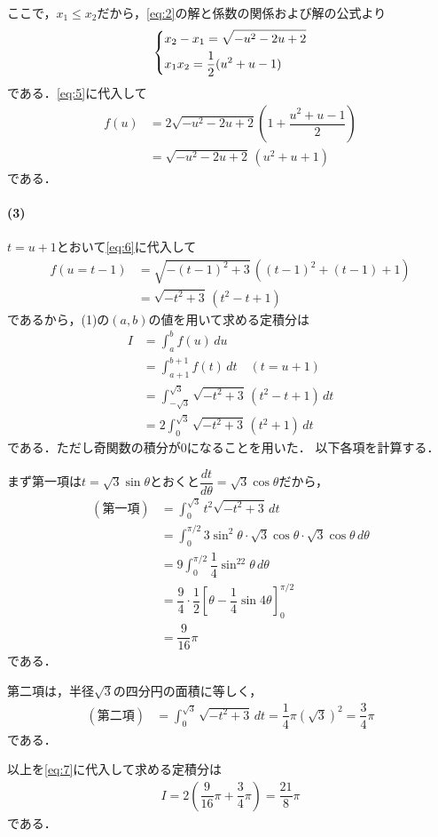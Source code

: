 \documentclass[../../main.tex]{subfiles}
\begin{document}
ここで，$x_1\le x_2$だから，\cref{eq:2}の解と係数の関係および解の公式より
\begin{align}
  \begin{dcases}
    x_2-x_1=\sqrt{-u^2-2u+2} \\
    x_1x_2=\dfrac{1}{2}(u^2+u-1)
  \end{dcases}
\end{align}
である．\cref{eq:5}に代入して
\begin{align}
  f(u)
  &=2\sqrt{-u^2-2u+2}\left(1+\dfrac{u^2+u-1}{2}\right)\\
  &=\sqrt{-u^2-2u+2}\,(u^2+u+1) \label{eq:6}
\end{align}
である．

\paragraph{(3)}

$t=u+1$とおいて\cref{eq:6}に代入して
\begin{align}
  f(u=t-1)
  &=\sqrt{-(t-1)^2+3}\,\left((t-1)^2+(t-1)+1\right)\\
  &=\sqrt{-t^2+3}\,(t^2-t+1)
\end{align}
であるから，(1)の$(a,b)$の値を用いて求める定積分は
\begin{align}
  I
  &=\int_{a}^{b}f(u)\, du \\
  &=\int_{a+1}^{b+1}f(t)\, dt  \quad (t=u+1) \\
  &=\int_{-\sqrt{3}}^{\sqrt{3}}\sqrt{-t^2+3}\,(t^2-t+1)\,dt \\
  &=2\int_0^{\sqrt{3}}\sqrt{-t^2+3}\,(t^2+1)\,dt \label{eq:7}
\end{align}
である．ただし奇関数の積分が$0$になることを用いた．
以下各項を計算する．

まず第一項は$t=\sqrt{3}\sin\theta$とおくと$\dfrac{dt}{d\theta}=\sqrt{3}\cos\theta$だから，
\begin{align}
  (\text{第一項})
  &= \int_0^{\sqrt{3}}t^2\sqrt{-t^2+3}\,dt \\
  &=\int_0^{\pi/2}3\sin^2\theta\cdot\sqrt{3}\cos\theta\cdot\sqrt{3}\cos\theta\,d\theta\\
  &=9\int_0^{\pi/2}\dfrac{1}{4}\sin^22\theta\,d\theta\\
  &=\dfrac{9}{4}\cdot\dfrac{1}{2}\left[\theta-\dfrac{1}{4}\sin4\theta\right]_0^{\pi/2} \\
  &=\dfrac{9}{16}\pi
\end{align}
である．

第二項は，半径$\sqrt{3}$の四分円の面積に等しく，
\begin{align}
  (\text{第二項})
  &=\int_0^{\sqrt{3}}\sqrt{-t^2+3}\,dt=\dfrac{1}{4}\pi(\sqrt{3})^2=\dfrac{3}{4}\pi
\end{align}
である．

以上を\cref{eq:7}に代入して求める定積分は
\begin{align}
  I=2\left(\dfrac{9}{16}\pi+\dfrac{3}{4}\pi\right)=\dfrac{21}{8}\pi
\end{align}
である．
\end{document}
